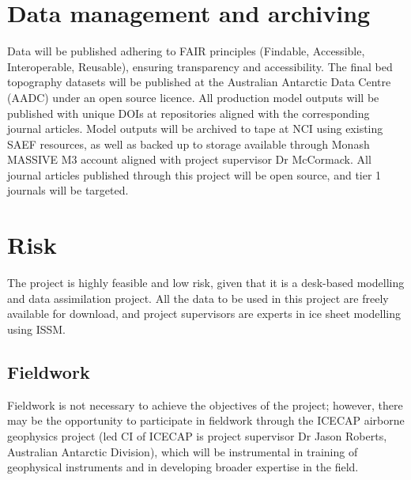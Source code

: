 \section*{Data management and archiving}

Data will be published adhering to FAIR principles (Findable, Accessible, Interoperable, Reusable), ensuring transparency and accessibility. The final bed topography datasets will be published at the Australian Antarctic Data Centre (AADC) under an open source licence. All production model outputs will be published with unique DOIs at repositories aligned with the corresponding journal articles. Model outputs will be archived to tape at NCI using existing SAEF resources, as well as backed up to storage available through Monash MASSIVE M3 account aligned with project supervisor Dr McCormack. All journal articles published through this project will be open source, and tier 1 journals will be targeted.

\section*{Risk}

The project is highly feasible and low risk, given that it is a desk-based modelling and data assimilation project. All the data to be used in this project are freely available for download, and project supervisors are experts in ice sheet modelling using ISSM. 

\subsection*{Fieldwork}
Fieldwork is not necessary to achieve the objectives of the project; however, there may be the opportunity to participate in fieldwork through the ICECAP airborne geophysics project (led CI of ICECAP is project supervisor Dr Jason Roberts, Australian Antarctic Division), which will be instrumental in training of geophysical instruments and in developing broader expertise in the field.